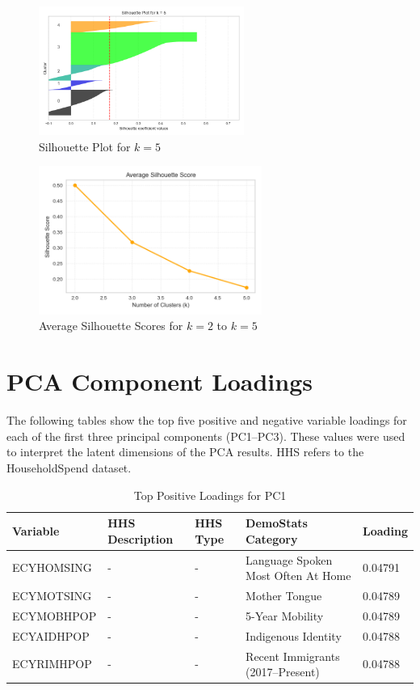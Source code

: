\documentclass{article}
\begin{document}
\begin{figure}[H]
    \centering
    \includegraphics[width=0.6\textwidth]{figures/silhouette_k5.png}
    \caption{Silhouette Plot for $k=5$}
    \label{fig:silhouette_k5}
\end{figure}

\begin{figure}[H]
    \centering
    \includegraphics[width=0.65\textwidth]{figures/silhouette_scores.png}
    \caption{Average Silhouette Scores for $k=2$ to $k=5$}
    \label{fig:silhouette_scores}
\end{figure}


\section{PCA Component Loadings}

The following tables show the top five positive and negative variable loadings for each of the first three principal components (PC1–PC3). These values were used to interpret the latent dimensions of the PCA results. HHS refers to the HouseholdSpend dataset.

\begin{table}[H]
\centering
\caption{Top Positive Loadings for PC1}
\label{tab:pc1_pos}
\begin{tabular}{@{}lllll@{}}
\toprule
Variable & HHS Description & HHS Type & DemoStats Category & Loading \\
\midrule
ECYHOMSING & - & - & Language Spoken Most Often At Home & 0.04791 \\
ECYMOTSING & - & - & Mother Tongue & 0.04789 \\
ECYMOBHPOP & - & - & 5-Year Mobility & 0.04789 \\
ECYAIDHPOP & - & - & Indigenous Identity & 0.04788 \\
ECYRIMHPOP & - & - & Recent Immigrants (2017–Present) & 0.04788 \\
\bottomrule
\end{tabular}
\end{table}
\end{document}
